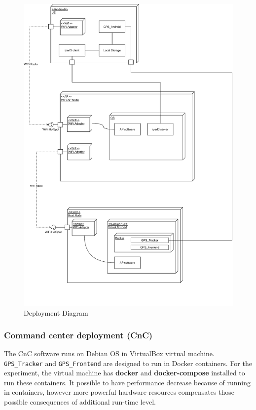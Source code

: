 \begin{figure}[H]
\centering
\includegraphics[width=\linewidth, keepaspectratio]{images/Deployment Diagram-Deployment_Diagram.pdf}
\caption{Deployment Diagram}
\label{fig:deployment-diagram}
\end{figure}

\subsubsection{Command center deployment
(CnC)}\label{command-center-deployment-cnc}

The CnC software runs on Debian OS in VirtualBox virtual machine.
\texttt{GPS\_Tracker} and \texttt{GPS\_Frontend} are designed to run in
Docker containers. For the experiment, the virtual machine has \textbf{docker}
and \textbf{docker-compose} installed to run these containers. It possible to have performance decrease because of running in containers, however more powerful hardware resources compensates those possible consequences of additional run-time level.

